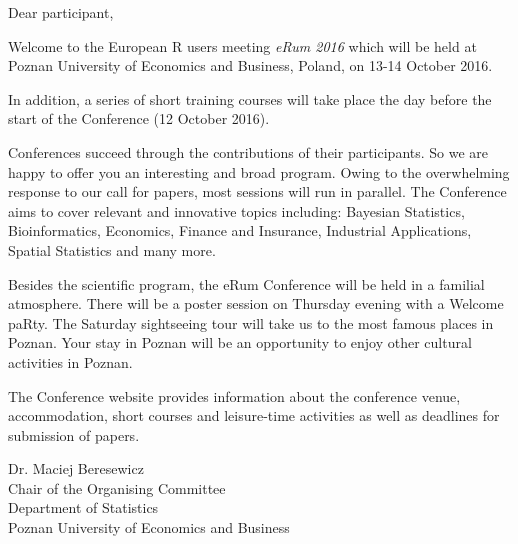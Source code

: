 \Large
\raggedright Dear participant,

Welcome to the European R users meeting \textit{eRum 2016} which will be held at Poznan University of Economics and Business, Poland, on 13-14 October 2016.

In addition, a series of short training courses will take place the day before the start of the Conference (12 October 2016).

Conferences succeed through the contributions of their participants. So we are happy to offer you an interesting and broad program. Owing to the overwhelming response to our call for papers, most sessions will run in parallel. The Conference aims to cover relevant and innovative topics including: Bayesian Statistics, Bioinformatics, Economics, Finance and Insurance, Industrial Applications, Spatial Statistics and many more.

Besides the scientific program, the eRum Conference will be held in a familial atmosphere. There will be a poster session on Thursday evening with a Welcome paRty. The Saturday sightseeing tour will take us to the most famous places in Poznan. Your stay in Poznan will be an opportunity to enjoy other cultural activities in Poznan.

The Conference website provides information about the conference venue, accommodation, short courses and leisure-time activities as well as deadlines for submission of papers.

\vspace{1.5cm}

\begin{flushleft}
Dr. Maciej Beresewicz  \\
\vspace{0.5cm}
Chair of the Organising Committee \\ 
Department of Statistics \\ 
Poznan University of Economics and Business
\end{flushleft}
